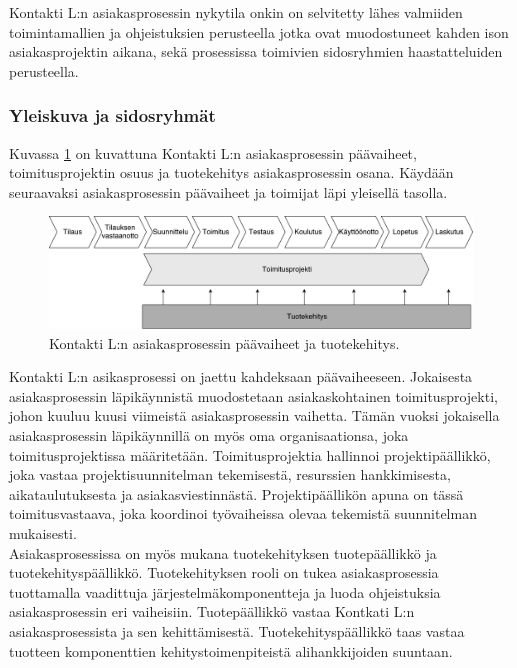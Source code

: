 \documentclass[finnish,12pt,a4paper,pdftex]{article}
\begin{document}
Kontakti L:n asiakasprosessin nykytila onkin on selvitetty lähes valmiiden toimintamallien ja ohjeistuksien perusteella jotka ovat muodostuneet kahden ison asiakasprojektin aikana, sekä prosessissa toimivien sidosryhmien haastatteluiden perusteella.

\subsubsection{Yleiskuva ja sidosryhmät}

Kuvassa \ref{fig:paavaih} on kuvattuna Kontakti L:n asiakasprosessin päävaiheet, toimitusprojektin osuus ja tuotekehitys asiakasprosessin osana. Käydään seuraavaksi asiakasprosessin päävaiheet ja toimijat läpi yleisellä tasolla.\\

\begin{figure}[!h]
    \centering
    \includegraphics[scale=0.4]{images/ODI-prosessi.pdf}
    \caption{Kontakti L:n asiakasprosessin päävaiheet ja tuotekehitys.}
    \label{fig:paavaih}
\end{figure}

Kontakti L:n asikasprosessi on jaettu kahdeksaan päävaiheeseen. Jokaisesta asiakasprosessin läpikäynnistä muodostetaan asiakaskohtainen toimitusprojekti, johon kuuluu kuusi viimeistä asiakasprosessin vaihetta. Tämän vuoksi jokaisella asiakasprosessin läpikäynnillä on myös oma organisaationsa, joka toimitusprojektissa määritetään. Toimitusprojektia hallinnoi projektipäällikkö, joka vastaa projektisuunnitelman tekemisestä, resurssien hankkimisesta, aikataulutuksesta ja asiakasviestinnästä. Projektipäällikön apuna on tässä toimitusvastaava, joka koordinoi työvaiheissa olevaa tekemistä suunnitelman mukaisesti.\\

Asiakasprosessissa on myös mukana tuotekehityksen tuotepäällikkö ja tuotekehityspäällikkö. Tuotekehityksen rooli on tukea asiakasprosessia tuottamalla vaadittuja järjestelmäkomponentteja ja luoda ohjeistuksia asiakasprosessin eri vaiheisiin. Tuotepäällikkö vastaa Kontkati L:n asiakasprosessista ja sen kehittämisestä. Tuotekehityspäällikkö taas vastaa tuotteen komponenttien kehitystoimenpiteistä alihankkijoiden suuntaan.\\
\end{document}

